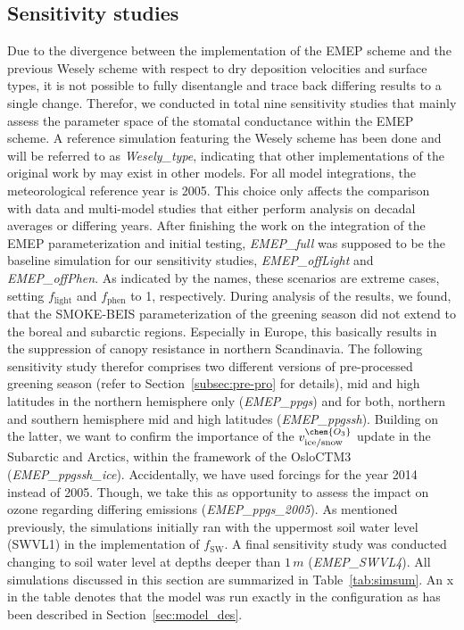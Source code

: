 \documentclass[gmd, manuscript]{copernicus}
\begin{document}
\subsection{Sensitivity studies}
\label{subsec:sens}
Due to the divergence between the implementation of the EMEP scheme and the previous Wesely scheme with respect to dry deposition velocities and surface types, it is not possible to fully disentangle and trace back differing results to a single change. Therefor, we conducted in total nine sensitivity studies that mainly assess the parameter space of the stomatal conductance within the EMEP scheme. A reference simulation featuring the Wesely scheme has been done and will be referred to as \emph{Wesely\_type}, indicating that other implementations of the original work by \citet{AE:Wesely1989} may exist in other models. For all model integrations, the meteorological reference year is 2005. This choice only affects the comparison with data and multi-model studies that either perform analysis on decadal averages or differing years. After finishing the work on the integration of the EMEP parameterization and initial testing, \emph{EMEP\_full} was supposed to be the baseline simulation for our sensitivity studies, \emph{EMEP\_offLight} and \emph{EMEP\_offPhen}. As indicated by the names, these scenarios are extreme cases, setting $f_\text{light}$ and $f_\text{phen}$ to 1, respectively. During analysis of the results, we found, that the SMOKE-BEIS parameterization of the greening season did not extend to the boreal and subarctic regions. Especially in Europe, this basically results in the suppression of canopy resistance in northern Scandinavia. The following sensitivity study therefor comprises two different versions of pre-processed greening season (refer to Section~\ref{subsec:pre-pro} for details), mid and high latitudes in the northern hemisphere only (\emph{EMEP\_ppgs}) and for both, northern and southern hemisphere mid and high latitudes (\emph{EMEP\_ppgssh}). Building on the latter, we want to confirm the importance of the $v^\chem{O_3}_\text{ice/snow}$ update \citep{ACP:Helmig2007} in the Subarctic and Arctics, within the framework of the OsloCTM3 (\emph{EMEP\_ppgssh\_ice}). Accidentally, we have used forcings for the year 2014 instead of 2005. Though, we take this as opportunity to assess the impact on ozone regarding differing emissions (\emph{EMEP\_ppgs\_2005}). As mentioned previously, the simulations initially ran with the uppermost soil water level (SWVL1) in the implementation of $f_\text{SW}$. A final sensitivity study was conducted changing to soil water level at depths deeper than $1\,\unit{m}$ (\emph{EMEP\_SWVL4}).
All simulations discussed in this section are summarized in Table~\ref{tab:simsum}. An x in the table denotes that the model was run exactly in the configuration as has been described in Section~\ref{sec:model_des}.
\end{document}
